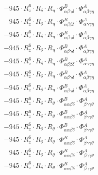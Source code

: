 \documentclass{article}
\begin{document}
\begin{subequations}
\begin{gather}
\begin{array}{c}
 \\[0.2em] 		 - 945 \cdot R_{z}^{6} \cdot R_{\delta{}} \cdot R_{\eta{}} \cdot \Phi{}^{B}_{\alpha{}\beta{}\gamma{}\delta{}} \cdot \Phi{}^{A}_{\alpha{}\beta{}\gamma{}\eta{}} 
 \\[0.2em] 		 - 945 \cdot R_{z}^{6} \cdot R_{\delta{}} \cdot R_{\eta{}} \cdot \Phi{}^{B}_{\alpha{}\beta{}\beta{}\delta{}} \cdot \Phi{}^{A}_{\alpha{}\gamma{}\gamma{}\eta{}} 
 \\[0.2em] 		 - 945 \cdot R_{z}^{6} \cdot R_{\delta{}} \cdot R_{\eta{}} \cdot \Phi{}^{B}_{\alpha{}\beta{}\gamma{}\delta{}} \cdot \Phi{}^{A}_{\alpha{}\beta{}\gamma{}\eta{}} 
 \\[0.2em] 		 - 945 \cdot R_{z}^{6} \cdot R_{\delta{}} \cdot R_{\eta{}} \cdot \Phi{}^{B}_{\alpha{}\beta{}\gamma{}\delta{}} \cdot \Phi{}^{A}_{\alpha{}\beta{}\gamma{}\eta{}} 
 \\[0.2em] 		 - 945 \cdot R_{z}^{6} \cdot R_{\delta{}} \cdot R_{\eta{}} \cdot \Phi{}^{B}_{\alpha{}\beta{}\beta{}\delta{}} \cdot \Phi{}^{A}_{\alpha{}\gamma{}\gamma{}\eta{}} 
 \\[0.2em] 		 - 945 \cdot R_{z}^{6} \cdot R_{\delta{}} \cdot R_{\eta{}} \cdot \Phi{}^{B}_{\alpha{}\beta{}\gamma{}\delta{}} \cdot \Phi{}^{A}_{\alpha{}\beta{}\gamma{}\eta{}} 
 \\[0.2em] 		 - 945 \cdot R_{z}^{6} \cdot R_{\delta{}} \cdot R_{\eta{}} \cdot \Phi{}^{B}_{\alpha{}\beta{}\gamma{}\delta{}} \cdot \Phi{}^{A}_{\alpha{}\beta{}\gamma{}\eta{}} 
 \\[0.2em] 		 - 945 \cdot R_{z}^{6} \cdot R_{\delta{}} \cdot R_{\theta{}} \cdot \Phi{}^{B}_{\alpha{}\alpha{}\beta{}\delta{}} \cdot \Phi{}^{A}_{\beta{}\gamma{}\gamma{}\theta{}} 
 \\[0.2em] 		 - 945 \cdot R_{z}^{6} \cdot R_{\delta{}} \cdot R_{\theta{}} \cdot \Phi{}^{B}_{\alpha{}\alpha{}\beta{}\delta{}} \cdot \Phi{}^{A}_{\beta{}\gamma{}\gamma{}\theta{}} 
 \\[0.2em] 		 - 945 \cdot R_{z}^{6} \cdot R_{\delta{}} \cdot R_{\theta{}} \cdot \Phi{}^{B}_{\alpha{}\alpha{}\beta{}\delta{}} \cdot \Phi{}^{A}_{\beta{}\gamma{}\gamma{}\theta{}} 
 \\[0.2em] 		 - 945 \cdot R_{z}^{6} \cdot R_{\delta{}} \cdot R_{\theta{}} \cdot \Phi{}^{B}_{\alpha{}\alpha{}\beta{}\delta{}} \cdot \Phi{}^{A}_{\beta{}\gamma{}\gamma{}\theta{}} 
 \\[0.2em] 		 - 945 \cdot R_{z}^{6} \cdot R_{\delta{}} \cdot R_{\theta{}} \cdot \Phi{}^{B}_{\alpha{}\alpha{}\beta{}\delta{}} \cdot \Phi{}^{A}_{\beta{}\gamma{}\gamma{}\theta{}} 
 \\[0.2em] 		 - 945 \cdot R_{z}^{6} \cdot R_{\delta{}} \cdot R_{\theta{}} \cdot \Phi{}^{B}_{\alpha{}\alpha{}\beta{}\delta{}} \cdot \Phi{}^{A}_{\beta{}\gamma{}\gamma{}\theta{}} 

\end{array}
\end{gather}
\end{subequations}
\end{document}
